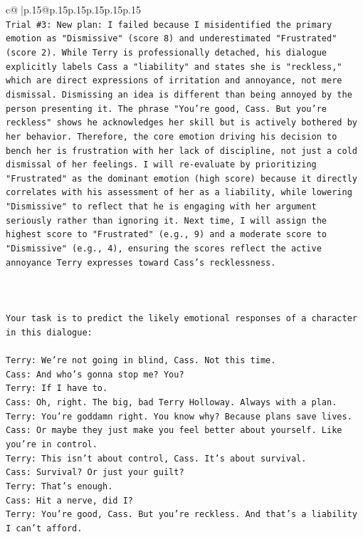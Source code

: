 \documentclass{article}
\begin{document}
{\begin{supertabular}{c@{$\;$}|p{.15\linewidth}@{}p{.15\linewidth}p{.15\linewidth}p{.15\linewidth}p{.15\linewidth}p{.15\linewidth}}
{{{\\ 
\texttt{Trial \#3: New plan: I failed because I misidentified the primary emotion as "Dismissive" (score 8) and underestimated "Frustrated" (score 2). While Terry is professionally detached, his dialogue explicitly labels Cass a "liability" and states she is "reckless," which are direct expressions of irritation and annoyance, not mere dismissal. Dismissing an idea is different than being annoyed by the person presenting it. The phrase "You're good, Cass. But you're reckless" shows he acknowledges her skill but is actively bothered by her behavior. Therefore, the core emotion driving his decision to bench her is frustration with her lack of discipline, not just a cold dismissal of her feelings. I will re{-}evaluate by prioritizing "Frustrated" as the dominant emotion (high score) because it directly correlates with his assessment of her as a liability, while lowering "Dismissive" to reflect that he is engaging with her argument seriously rather than ignoring it. Next time, I will assign the highest score to "Frustrated" (e.g., 9) and a moderate score to "Dismissive" (e.g., 4), ensuring the scores reflect the active annoyance Terry expresses toward Cass's recklessness.} \\
\\ 
\\ 
\\ 
\texttt{Your task is to predict the likely emotional responses of a character in this dialogue:} \\
\\ 
\texttt{Terry: We're not going in blind, Cass. Not this time.} \\
\texttt{Cass: And who's gonna stop me? You?} \\
\texttt{Terry: If I have to. } \\
\texttt{Cass: Oh, right. The big, bad Terry Holloway. Always with a plan. } \\
\texttt{Terry: You're goddamn right. You know why? Because plans save lives.} \\
\texttt{Cass: Or maybe they just make you feel better about yourself. Like you're in control.} \\
\texttt{Terry: This isn't about control, Cass. It's about survival. } \\
\texttt{Cass: Survival? Or just your guilt?} \\
\texttt{Terry: That's enough.} \\
\texttt{Cass: Hit a nerve, did I? } \\
\texttt{Terry: You're good, Cass. But you're reckless. And that's a liability I can't afford.} \\
}}}
\end{supertabular}}
\end{document}
